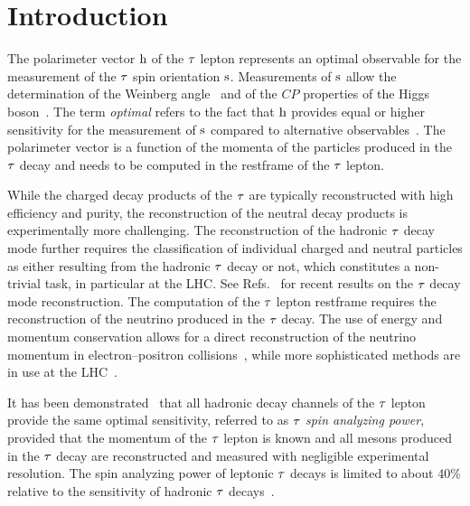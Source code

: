 \section{Introduction}
\label{sec:Introduction}

The polarimeter vector $\textrm{h}$ of the $\tau$ lepton represents an optimal observable for the measurement of the $\tau$ spin orientation $\textrm{s}$.
Measurements of $\textrm{s}$ allow the determination of the Weinberg angle~\cite{ALEPH:2001uca,DELPHI:1999yne,L3:1998oan,OPAL:2001brm,ATLAS:2017xuc,CMS:2023mgq} and of the $CP$ properties of the Higgs boson~\cite{ATLAS:2022akr,CMS:2021sdq}.
The term {\em optimal} refers to the fact that $\textrm{h}$ provides equal or higher sensitivity for the measurement of $\textrm{s}$ compared to alternative observables~\cite{Davier:1992nw}.
The polarimeter vector is a function of the momenta of the particles produced in the $\tau$ decay and needs to be computed in the restframe of the $\tau$ lepton. 

While the charged decay products of the $\tau$ are typically reconstructed with high efficiency and purity, the reconstruction of the neutral decay products is experimentally more challenging. The reconstruction of the hadronic $\tau$ decay mode further requires the classification of individual charged and neutral particles as either resulting from the hadronic $\tau$ decay or not, which constitutes a non-trivial task, in particular at the LHC. See Refs.~\cite{Behnke:2013lya,Tran:2015nxa,ATLAS:2015boj,Xu:2017lgs,CMS-DP-2020-041,CMS:2022prd,Giagu:2022gmq,ATLAS:2022aip} for recent results on the $\tau$ decay mode reconstruction. The computation of the $\tau$ lepton restframe requires the reconstruction of the neutrino produced in the $\tau$ decay. The use of energy and momentum conservation allows for a direct reconstruction of the neutrino momentum in electron--positron collisions~\cite{Altakach:2022ywa,Ehataht:2023zzt}, while more sophisticated methods are in use at the LHC~\cite{Elagin:2010aw,Bianchini:2016yrt,Sauerland:1358627,Cherepanov:2018npf}.

It has been demonstrated~\cite{Kuhn:1995nn} that all hadronic decay channels of the $\tau$ lepton provide the same optimal sensitivity, referred to as {\em $\tau$ spin analyzing power}, provided that the momentum of the $\tau$ lepton is known and all mesons produced in the $\tau$ decay are reconstructed and measured with negligible experimental resolution. The spin analyzing power of leptonic $\tau$ decays is limited to about $40\%$ relative to the sensitivity of hadronic $\tau$ decays~\cite{Davier:1992nw}.

